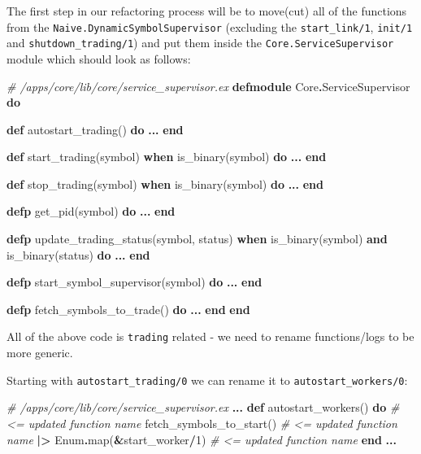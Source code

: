 \documentclass[
  oneside]{book}
\newenvironment{Shaded}{\begin{snugshade}}{\end{snugshade}}
\newcommand{\CommentTok}[1]{\textcolor[rgb]{0.56,0.35,0.01}{\textit{#1}}}
\newcommand{\ConstantTok}[1]{\textcolor[rgb]{0.00,0.00,0.00}{#1}}
\newcommand{\DecValTok}[1]{\textcolor[rgb]{0.00,0.00,0.81}{#1}}
\newcommand{\KeywordTok}[1]{\textcolor[rgb]{0.13,0.29,0.53}{\textbf{#1}}}
\newcommand{\NormalTok}[1]{#1}
\newcommand{\OperatorTok}[1]{\textcolor[rgb]{0.81,0.36,0.00}{\textbf{#1}}}
\begin{document}
The first step in our refactoring process will be to move(cut) all of the functions from the \texttt{Naive.DynamicSymbolSupervisor} (excluding the \texttt{start\_link/1}, \texttt{init/1} and \texttt{shutdown\_trading/1}) and put them inside the \texttt{Core.ServiceSupervisor} module which should look as follows:

\begin{Shaded}
\begin{Highlighting}[]
\CommentTok{\# /apps/core/lib/core/service\_supervisor.ex}
\KeywordTok{defmodule} \ConstantTok{Core}\OperatorTok{.}\ConstantTok{ServiceSupervisor} \KeywordTok{do}

  \KeywordTok{def}\NormalTok{ autostart\_trading() }\KeywordTok{do}
    \OperatorTok{...}
  \KeywordTok{end}

  \KeywordTok{def}\NormalTok{ start\_trading(symbol) }\KeywordTok{when}\NormalTok{ is\_binary(symbol) }\KeywordTok{do}
    \OperatorTok{...}
  \KeywordTok{end}

  \KeywordTok{def}\NormalTok{ stop\_trading(symbol) }\KeywordTok{when}\NormalTok{ is\_binary(symbol) }\KeywordTok{do}
    \OperatorTok{...}
  \KeywordTok{end}

  \KeywordTok{defp}\NormalTok{ get\_pid(symbol) }\KeywordTok{do}
    \OperatorTok{...}
  \KeywordTok{end}

  \KeywordTok{defp}\NormalTok{ update\_trading\_status(symbol, status)}
       \KeywordTok{when}\NormalTok{ is\_binary(symbol) }\KeywordTok{and}\NormalTok{ is\_binary(status) }\KeywordTok{do}
    \OperatorTok{...}
  \KeywordTok{end}

  \KeywordTok{defp}\NormalTok{ start\_symbol\_supervisor(symbol) }\KeywordTok{do}
    \OperatorTok{...}
  \KeywordTok{end}

  \KeywordTok{defp}\NormalTok{ fetch\_symbols\_to\_trade() }\KeywordTok{do}
    \OperatorTok{...}
  \KeywordTok{end}
\KeywordTok{end}
\end{Highlighting}
\end{Shaded}

All of the above code is \texttt{trading} related - we need to rename functions/logs to be more generic.

Starting with \texttt{autostart\_trading/0} we can rename it to \texttt{autostart\_workers/0}:

\begin{Shaded}
\begin{Highlighting}[]
  \CommentTok{\# /apps/core/lib/core/service\_supervisor.ex}
  \OperatorTok{...}
  \KeywordTok{def}\NormalTok{ autostart\_workers() }\KeywordTok{do}     \CommentTok{\# \textless{}= updated function name}
\NormalTok{    fetch\_symbols\_to\_start()     }\CommentTok{\# \textless{}= updated function name}
    \OperatorTok{|\textgreater{}} \ConstantTok{Enum}\OperatorTok{.}\NormalTok{map(}\OperatorTok{\&}\NormalTok{start\_worker}\OperatorTok{/}\DecValTok{1}\NormalTok{) }\CommentTok{\# \textless{}= updated function name}
  \KeywordTok{end}
  \OperatorTok{...}
\end{Highlighting}
\end{Shaded}
\end{document}
